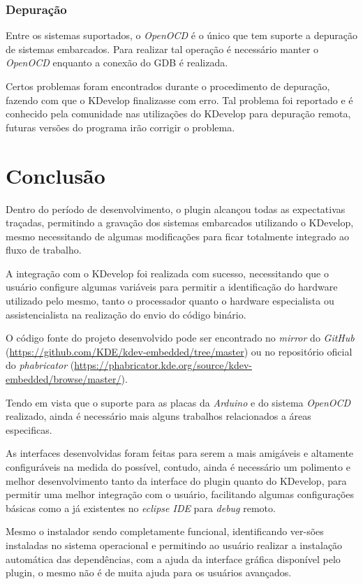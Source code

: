 \subsection{Depuração}
Entre os sistemas suportados, o \textit{OpenOCD} é o único que tem suporte a depuração de sistemas embarcados. Para realizar tal operação é necessário manter o \textit{OpenOCD} enquanto a conexão do GDB é realizada.

Certos problemas foram encontrados durante o procedimento de depuração, fazendo com que o KDevelop finalizasse com erro. Tal problema foi reportado e é conhecido pela comunidade nas utilizações do KDevelop para depuração remota, futuras versões do programa irão corrigir o problema.

\chapter{Conclusão}
Dentro do período de desenvolvimento, o plugin alcançou todas as expectativas traçadas, permitindo a gravação dos sistemas embarcados utilizando o KDevelop, mesmo necessitando de algumas modificações para ficar totalmente integrado ao fluxo de trabalho.

A integração com o KDevelop foi realizada com sucesso, necessitando que o usuário configure algumas variáveis para permitir a identificação do hardware utilizado pelo mesmo, tanto o processador quanto o hardware especialista ou assistencialista na realização do envio do código binário.

O código fonte do projeto desenvolvido pode ser encontrado no \textit{mirror} do \textit{GitHub} (\url{https://github.com/KDE/kdev-embedded/tree/master}) ou no repositório oficial do \textit{phabricator} (\url{https://phabricator.kde.org/source/kdev-embedded/browse/master/}).

Tendo em vista que o suporte para as placas da \textit{Arduino} e do sistema \textit{OpenOCD} realizado, ainda é necessário mais alguns trabalhos relacionados a áreas especificas.

As interfaces desenvolvidas foram feitas para serem a mais amigáveis e altamente configuráveis na medida do possível, contudo, ainda é necessário um polimento e melhor desenvolvimento tanto da interface do plugin quanto do KDevelop, para permitir uma melhor integração com o usuário, facilitando algumas configurações básicas como a já existentes no \textit{eclipse IDE} para \textit{debug} remoto.

Mesmo o instalador sendo completamente funcional, identificando ver-sões instaladas no sistema operacional e
permitindo ao usuário realizar a instalação automática das dependências, com a ajuda da interface gráfica disponível pelo plugin, o mesmo não é de muita ajuda para os usuários avançados.

